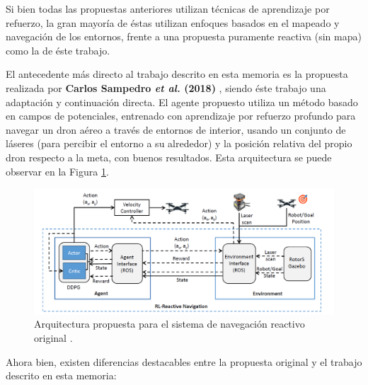 Si bien todas las propuestas anteriores utilizan técnicas de aprendizaje por refuerzo, la gran mayoría de éstas utilizan enfoques basados en el mapeado y navegación de los entornos, frente a una propuesta puramente reactiva (sin mapa) como la de éste trabajo.

El antecedente más directo al trabajo descrito en esta memoria es la propuesta realizada por \textbf{Carlos Sampedro \textit{et al.} (2018)} \cite{Sampedro2018}, siendo éste trabajo una adaptación y continuación directa. El agente propuesto utiliza un método basado en campos de potenciales, entrenado con aprendizaje por refuerzo profundo para navegar un dron aéreo a través de entornos de interior, usando un conjunto de láseres (para percibir el entorno a su alrededor) y la posición relativa del propio dron respecto a la meta, con buenos resultados. Esta arquitectura se puede observar en la Figura \ref{fig:chap2-drone}.

\begin{figure}[h]
    \centering
    \includegraphics[width=\textwidth]{imagenes/cap2/drone-architecture.png}
    \caption{Arquitectura propuesta para el sistema de navegación reactivo original \cite{Sampedro2018}.}
    \label{fig:chap2-drone}
\end{figure}

Ahora bien, existen diferencias destacables entre la propuesta original y el trabajo descrito en esta memoria:

